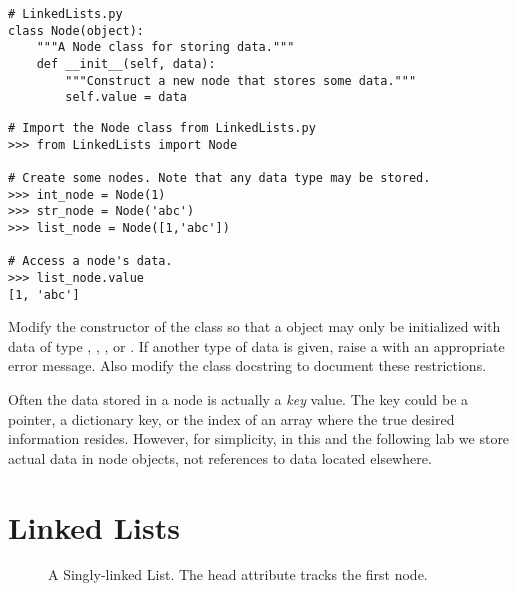 \begin{lstlisting}
# LinkedLists.py
class Node(object):
	"""A Node class for storing data."""
	def __init__(self, data):
		"""Construct a new node that stores some data."""
		self.value = data
\end{lstlisting}

\begin{lstlisting}
# Import the Node class from LinkedLists.py
>>> from LinkedLists import Node

# Create some nodes. Note that any data type may be stored.
>>> int_node = Node(1)
>>> str_node = Node('abc')
>>> list_node = Node([1,'abc'])

# Access a node's data.
>>> list_node.value
[1, 'abc']
\end{lstlisting}

\begin{problem}
Modify the constructor of the  class so that a  object may only be initialized with data of type , , , or .
If another type of data is given, raise a  with an appropriate error message.
Also modify the class docstring to document these restrictions.
\end{problem}

\begin{info}
Often the data stored in a node is actually a \emph{key} value.
The key could be a pointer, a dictionary key, or the index of an array where the true desired information resides.
However, for simplicity, in this and the following lab we store actual data in node objects, not references to data located elsewhere.
\end{info}

\section*{Linked Lists}

\begin{figure}
\centering
{}
\caption{A Singly-linked List. The head attribute tracks the first node.}
\label{fig:singly_linked}
\end{figure}

